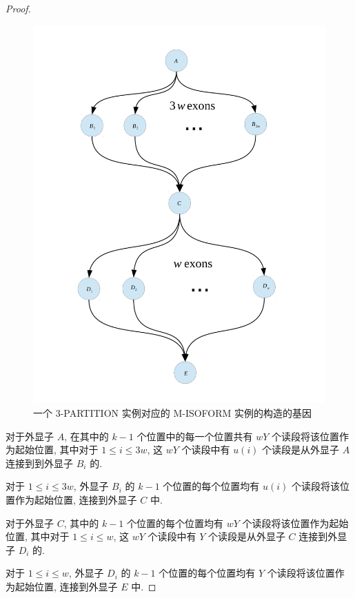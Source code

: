 \begin{proof}
\begin{figure}[!t]
\centering
\includegraphics[width=1.0\textwidth]{figures/nphard/part3-gene.pdf}
\caption{一个 3-PARTITION 实例对应的 M-ISOFORM 实例的构造的基因}
\label{tripart-reduce-gene}
\end{figure}

对于外显子 $A$, 在其中的 $k-1$ 个位置中的每一个位置共有 $wY$ 个读段将该位置作为起始位置, 
其中对于 $1\leq i\leq 3w$, 
这 $wY$ 个读段中有 $u(i)$ 个读段是从外显子 $A$ 连接到到外显子 $B_i$ 的. 

对于 $1\leq i\leq 3w$, 
外显子 $B_i$ 的 $k-1$ 个位置的每个位置均有 $u(i)$ 个读段将该位置作为起始位置, 
连接到外显子 $C$ 中. 

对于外显子 $C$, 其中的 $k-1$ 个位置的每个位置均有 $wY$ 个读段将该位置作为起始位置, 
其中对于 $1\leq i \leq w$,
这 $wY$ 个读段中有 $Y$ 个读段是从外显子 $C$ 连接到外显子 $D_i$ 的. 

对于 $1\leq i \leq w$,
外显子 $D_i$ 的 $k-1$ 个位置的每个位置均有 $Y$ 个读段将该位置作为起始位置, 
连接到外显子 $E$ 中. 


\end{proof}
